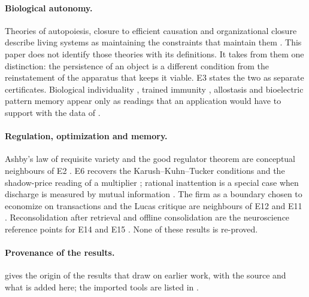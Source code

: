 \paragraph{Biological autonomy.} Theories of autopoiesis, closure to efficient causation and
organizational closure describe living systems as maintaining the constraints that maintain them
\citep{MaturanaVarela1980,Rosen1991,MorenoMossio2015,MonteilMossio2015}. This paper does not
identify those theories with its definitions. It takes from them one distinction: the persistence
of an object is a different condition from the reinstatement of the apparatus that keeps it viable.
E3 states the two as separate certificates. Biological individuality \citep{Clarke2010,GodfreySmith2009},
trained immunity \citep{NeteaEtAl2016}, allostasis \citep{SterlingEyer1988} and bioelectric pattern
memory \citep{PezzuloLevin2015} appear only as readings that an application would have to support
with the data of .

\paragraph{Regulation, optimization and memory.} Ashby's law of requisite variety and the good
regulator theorem are conceptual neighbours of E2 \citep{Ashby1956,ConantAshby1970}. E6 recovers
the Karush--Kuhn--Tucker conditions and the shadow-price reading of a multiplier
\citep{BoydVandenberghe2004}; rational inattention is a special case when discharge is measured by
mutual information \citep{Sims2003}. The firm as a boundary chosen to economize on transactions and
the Lucas critique are neighbours of E12 and E11 \citep{Coase1937,Lucas1976}. Reconsolidation after
retrieval and offline consolidation are the neuroscience reference points for E14 and E15
\citep{NaderSchafeLeDoux2000,Dudai2004,WalkerStickgold2006}. None of these results is re-proved.

\paragraph{Provenance of the results.}  gives the origin of the results that draw on
earlier work, with the source and what is added here; the imported tools are listed in
.

